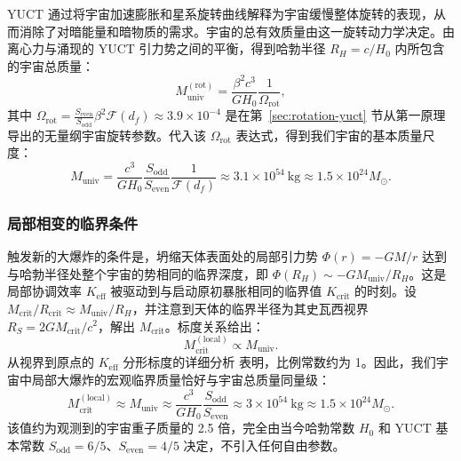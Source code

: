 \documentclass[11pt,a4paper]{article}
\begin{document}
	YUCT 通过将宇宙加速膨胀和星系旋转曲线解释为宇宙缓慢整体旋转的表现，从而消除了对暗能量和暗物质的需求。宇宙的总有效质量由这一旋转动力学决定。由离心力与涌现的 YUCT 引力势之间的平衡，得到哈勃半径 \(R_H = c/H_0\) 内所包含的宇宙总质量：
	\begin{equation}
		M_{\mathrm{univ}}^{\mathrm{(rot)}} = \frac{\beta^2 c^3}{G H_0} \frac{1}{\Omega_{\mathrm{rot}}},
	\end{equation}
	其中 \(\Omega_{\mathrm{rot}} = \frac{S_{\mathrm{even}}}{S_{\mathrm{odd}}} \beta^2 \mathcal{F}(d_f) \approx 3.9 \times 10^{-4}\) 是在第~\ref{sec:rotation-yuct} 节从第一原理导出的无量纲宇宙旋转参数。代入该 \(\Omega_{\mathrm{rot}}\) 表达式，得到我们宇宙的基本质量尺度：
	\begin{equation}
		M_{\mathrm{univ}} = \frac{c^3}{G H_0} \frac{S_{\mathrm{odd}}}{S_{\mathrm{even}}} \frac{1}{\mathcal{F}(d_f)} \approx 3.1 \times 10^{54}\ \mathrm{kg} \approx 1.5 \times 10^{24} M_{\odot}.
	\end{equation}
	
	\subsubsection{局部相变的临界条件}
	
	触发新的大爆炸的条件是，坍缩天体表面处的局部引力势 \(\Phi(r) = -GM/r\) 达到与哈勃半径处整个宇宙的势相同的临界深度，即 \(\Phi(R_H) \sim -G M_{\mathrm{univ}}/R_H\)。这是局部协调效率 \(K_{\mathrm{eff}}\) 被驱动到与启动原初暴胀相同的临界值 \(K_{\mathrm{crit}}\) 的时刻。设 \(M_{\mathrm{crit}}/R_{\mathrm{crit}} \approx M_{\mathrm{univ}}/R_H\)，并注意到天体的临界半径为其史瓦西视界 \(R_S = 2GM_{\mathrm{crit}}/c^2\)，解出 \(M_{\mathrm{crit}}\)。标度关系给出：
	\begin{equation}
		M_{\mathrm{crit}}^{\mathrm{(local)}} \propto M_{\mathrm{univ}}.
	\end{equation}
	从视界到原点的 \(K_{\mathrm{eff}}\) 分形标度的详细分析 \cite{AppendixL} 表明，比例常数约为 1。因此，我们宇宙中局部大爆炸的宏观临界质量恰好与宇宙总质量同量级：
	\begin{equation}
		\boxed{ M_{\mathrm{crit}}^{\mathrm{(local)}} \approx M_{\mathrm{univ}} \approx \frac{c^3}{G H_0} \frac{S_{\mathrm{odd}}}{S_{\mathrm{even}}} \approx 3 \times 10^{54}\ \mathrm{kg} \approx 1.5 \times 10^{24} M_{\odot} }.
		\label{eq:Mcrit-macro}
	\end{equation}
	该值约为观测到的宇宙重子质量的 2.5 倍，完全由当今哈勃常数 \(H_0\) 和 YUCT 基本常数 \(S_{\mathrm{odd}}=6/5\)、\(S_{\mathrm{even}}=4/5\) 决定，不引入任何自由参数。
	
\end{document}
